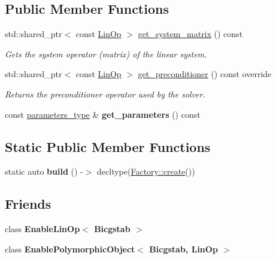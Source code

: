 \subsection*{Public Member Functions}
\begin{DoxyCompactItemize}
\item 
std\+::shared\+\_\+ptr$<$ const \hyperlink{classgko_1_1LinOp}{Lin\+Op} $>$ \hyperlink{classgko_1_1solver_1_1Bicgstab_ada73e8ca3e8924011c8780cab92f651e}{get\+\_\+system\+\_\+matrix} () const
\begin{DoxyCompactList}\small\item\em Gets the system operator (matrix) of the linear system. \end{DoxyCompactList}\item 
std\+::shared\+\_\+ptr$<$ const \hyperlink{classgko_1_1LinOp}{Lin\+Op} $>$ \hyperlink{classgko_1_1solver_1_1Bicgstab_ac16d32672fbc91d8cfd7c0607c9771db}{get\+\_\+preconditioner} () const override
\begin{DoxyCompactList}\small\item\em Returns the preconditioner operator used by the solver. \end{DoxyCompactList}\item 
\mbox{\label{classgko_1_1solver_1_1Bicgstab_ad9f55802a39cbf339c400f3a5eeb7a4a}} 
const \hyperlink{structgko_1_1solver_1_1Bicgstab_1_1parameters__type}{parameters\+\_\+type} \& {\bfseries get\+\_\+parameters} () const
\end{DoxyCompactItemize}
\subsection*{Static Public Member Functions}
\begin{DoxyCompactItemize}
\item 
\mbox{\label{classgko_1_1solver_1_1Bicgstab_a2c02a5d5c89197096004796743bfc22c}} 
static auto {\bfseries build} () -\/$>$ decltype(\hyperlink{classgko_1_1EnableDefaultFactory_a1d077101d9e788e6c65f088612d14cc3}{Factory\+::create}())
\end{DoxyCompactItemize}
\subsection*{Friends}
\begin{DoxyCompactItemize}
\item 
\mbox{\label{classgko_1_1solver_1_1Bicgstab_ab135a56fe121f9011363f034f1cd292e}} 
class {\bfseries Enable\+Lin\+Op$<$ Bicgstab $>$}
\item 
\mbox{\label{classgko_1_1solver_1_1Bicgstab_acd2682c6fc5c060a57df8f9cfad990b5}} 
class {\bfseries Enable\+Polymorphic\+Object$<$ Bicgstab, Lin\+Op $>$}
\end{DoxyCompactItemize}


